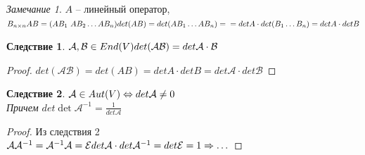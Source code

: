 \documentclass[12pt]{article}
\newtheorem{corollary}{Следствие}[theorem]
\theoremstyle{remark}
\newtheorem*{remark}{Замечание}
\theoremstyle{definition}
\newcommand{\0}{\mathbb{0}}
\newcommand{\E}{\mathcal{E}}
\newcommand{\A}{\mathcal{A}}
\newcommand{\B}{\mathcal{B}}
\begin{document}
	\begin{remark}
		$A$ -- линейный оператор, $B_{n\times n}\\
		AB = (AB_1 \ AB_2 \ldots AB_n)\\
		det(AB) = det(AB_1 \ldots AB_n) = \\
		= detA\cdot det(B_1\ldots B_n) = detA \cdot det B$
	\end{remark}
	\begin{corollary}
		$\A, \B \in End(V)\\
		det(\A\B) = det\A \cdot \B$
	\end{corollary}
	\begin{proof}
		$det(\A\B) = det(AB) = detA\cdot detB = det\A \cdot det\B$
	\end{proof}
	\begin{corollary}
		$\A\in Aut(V)\\
		\Leftrightarrow det\A \neq 0$\\
		Причем $det\det\A^{-1} = \frac{1}{det\A}$
	\end{corollary}
	\begin{proof}
		Из следствия 2\\
		$\A\A^{-1} = \A^{-1}\A = \E\\
		det\A \cdot det\A^{-1} = det\E = 1 \Rightarrow \ldots$
	\end{proof}
\end{document}
